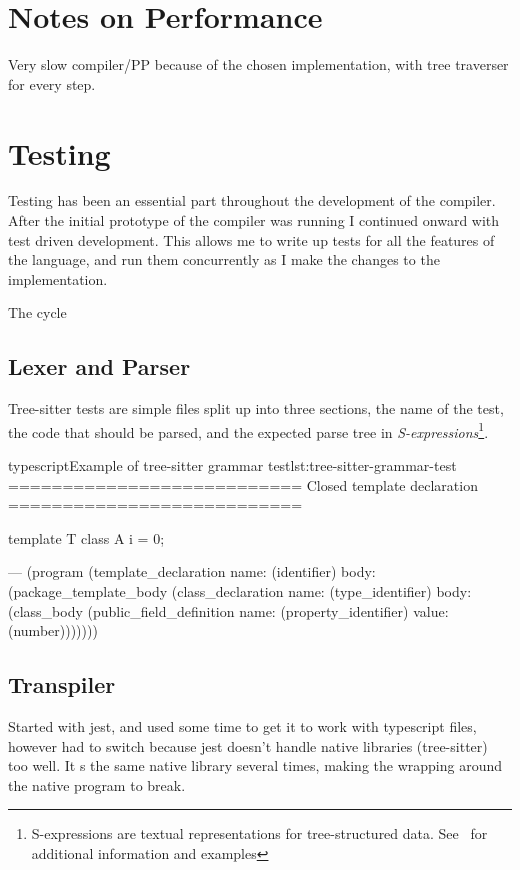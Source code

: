 \section{Notes on Performance}\label{sec:notes-on-performance}

Very slow compiler/PP because of the chosen implementation, with tree traverser for every step.


\section{Testing}\label{sec:testing}

Testing has been an essential part throughout the development of the compiler.
After the initial prototype of the compiler was running I continued onward with test driven development.
This allows me to write up tests for all the features of the language, and run them concurrently as I make the changes to the implementation.

The cycle

\subsection{Lexer and Parser}\label{subsec:testing-lexer-and-parser}

Tree-sitter tests are simple  files split up into three sections, the name of the test, the code that should be parsed, and the expected parse tree in \textit{S-expressions}\footnote{S-expressions are textual representations for tree-structured data. See~\cite{sexprs} for additional information and examples}.

\begin{code}{typescript}{Example of tree-sitter grammar test}{lst:tree-sitter-grammar-test}
    ===========================
    Closed template declaration
    ===========================

    template T {
        class A {
            i = 0;
        }
    }

    ---
    (program
        (template_declaration
            name: (identifier)
            body: (package_template_body
                    (class_declaration
                        name: (type_identifier)
                        body: (class_body
                            (public_field_definition
                                name: (property_identifier)
                                value: (number)))))))

\end{code}

\subsection{Transpiler}\label{subsec:testing-transpiler}

Started with jest, and used some time to get it to work with typescript files, however had to switch because jest doesn't handle native libraries (tree-sitter) too well.
It s the same native library several times, making the wrapping around the native program to break.